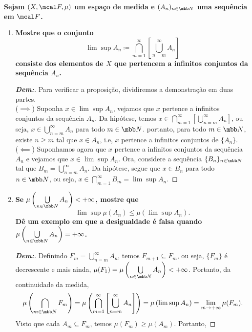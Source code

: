 \biglinend
\newpage 
{}
\bigline 
\textbf{Sejam $(X, \mcal F, \mu)$ um espaço de medida e $(A_n)_{n \in \mbb N}$
uma sequência em $\mcal F$.}
\begin{enumerate}[label=(\alph*), wide, labelindent=0pt]
  \item \textbf{Mostre que o conjunto 
    $$\lim \sup A_n \coloneq \bigcap_{m=1}^\infty\left
    [\bigcup\limits_{n = m}^\infty A_n\right]$$ 
    consiste dos elementos de $X$ que pertencem a infinitos conjuntos da sequência $A_n$.}
    \begin{proof}[\textbf{Dem:}] Para verificar a proposição, dividiremos a demonstração 
      em duas partes. \\
      ($\implies$) Suponha $x \in \lim\sup A_n$, vejamos que $x$ pertence a infinitos 
      conjuntos da sequência $A_n$. Da hipótese, temos $x \in \bigcap_{m=1}^\infty 
      \left[\bigcup_{n = m}^\infty A_n\right]$, ou seja, $x \in \bigcup_{n=m}^\infty A_n$
      para todo $m \in \mbb N$. portanto, para todo $m \in \mbb N$, existe $n \ge m$ tal que 
      $x \in A_n$, i.e, $x$ pertence a infinitos conjuntos de $\{A_n\}$.\\
      ($\impliedby$) Suponhamos agora que $x$ pertence a infinitos conjuntos da sequência 
      $A_n$ e vejamos que $x \in \lim\sup A_n$. Ora, considere a sequência 
      $\{B_n\}_{n \in \mbb N}$ tal que $B_m = \bigcup_{n=m}^\infty A_n$. Da hipótese, 
      segue que $x \in B_n$ para todo $n \in \mbb N$, ou seja, 
      $x \in \bigcap\limits_{m=1}^\infty B_m = \lim\sup A_n$. 
    \end{proof}
  \item \textbf{Se $\mu\left(\bigcup\limits_{n \in \mbb N} A_n\right) < +\infty$, mostre que 
    $$\lim \sup \mu (A_n) \le \mu(\lim\sup A_n).$$
  Dê um exemplo em que a desigualdade é falsa quando $\mu\left(\bigcup
    \limits_{n \in \mbb N} A_n\right) = +\infty$.}
    \begin{proof}[\textbf{Dem:}] Definindo $F_m = \bigcup\limits_{n = m}^\infty A_n$, temos 
      $F_{m + 1} \subseteq F_{m}$, ou seja, $\{F_m\}$ é decrescente e mais ainda, 
        $\mu(F_1) = \mu\left(\bigcup\limits_{n \in \mbb N} A_n\right) < +\infty$. 
        Portanto, da continuidade da medida, 
        $$\mu\left(\bigcap_{m \in \mbb N} F_m\right) =
        \mu\left(\bigcap_{m=1}^\infty\left[\bigcup\limits_{n = m}^\infty A_n\right]\right)
        = \mu\left(\lim\sup A_n\right) = \lim_{m \rightarrow +\infty} \mu(F_m).$$
      Visto que cada $A_m \subseteq F_m$, temos $\mu(F_m) \ge \mu(A_m)$. Portanto, 

\end{proof}
\end{enumerate}
